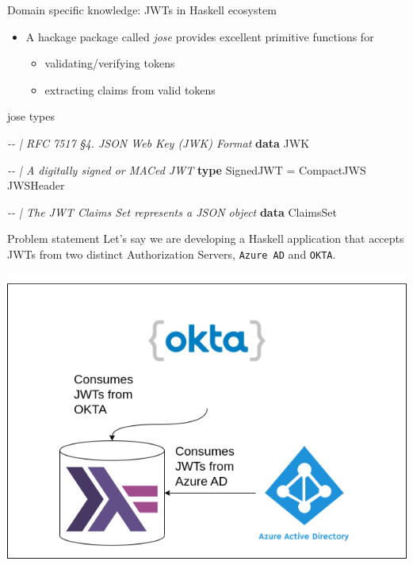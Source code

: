 \documentclass[
  9pt,
  ignorenonframetext,
]{beamer}
\newenvironment{Shaded}{}{}
\newcommand{\CommentTok}[1]{\textcolor[rgb]{0.38,0.63,0.69}{\textit{#1}}}
\newcommand{\DataTypeTok}[1]{\textcolor[rgb]{0.56,0.13,0.00}{#1}}
\newcommand{\KeywordTok}[1]{\textcolor[rgb]{0.00,0.44,0.13}{\textbf{#1}}}
\newcommand{\OtherTok}[1]{\textcolor[rgb]{0.00,0.44,0.13}{#1}}
\providecommand{\tightlist}{%
  \setlength{\itemsep}{0pt}\setlength{\parskip}{0pt}}
\begin{document}
\begin{frame}[fragile]{Domain specific knowledge: JWTs in Haskell
ecosystem}
\protect\hypertarget{domain-specific-knowledge-jwts-in-haskell-ecosystem}{}
\begin{itemize}
\tightlist
\item
  A hackage package called \emph{jose} provides excellent primitive
  functions for

  \begin{itemize}
  \tightlist
  \item
    validating/verifying tokens
  \item
    extracting claims from valid tokens
  \end{itemize}
\end{itemize}

\begin{block}{jose types}
\protect\hypertarget{jose-types}{}
\begin{Shaded}
\begin{Highlighting}[]
\CommentTok{{-}{-} | RFC 7517 §4.  JSON Web Key (JWK) Format}
\KeywordTok{data} \DataTypeTok{JWK} 

\CommentTok{{-}{-} | A digitally signed or MACed JWT}
\KeywordTok{type} \DataTypeTok{SignedJWT} \OtherTok{=} \DataTypeTok{CompactJWS} \DataTypeTok{JWSHeader}

\CommentTok{{-}{-} | The JWT Claims Set represents a JSON object }
\KeywordTok{data} \DataTypeTok{ClaimsSet}
\end{Highlighting}
\end{Shaded}
\end{block}






\end{frame}

\begin{frame}[fragile]{Problem statement}
\protect\hypertarget{problem-statement}{}
Let's say we are developing a Haskell application that accepts JWTs from
two distinct Authorization Servers, \texttt{Azure\ AD} and
\texttt{OKTA}.

\includegraphics[width=\textwidth,height=0.7\textheight]{resources/problem-statement.drawio.png}





\end{frame}
\end{document}
